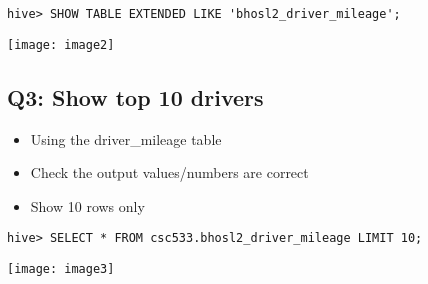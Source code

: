\documentclass[]{article}
\begin{document}
\begin{verbatim}
hive> SHOW TABLE EXTENDED LIKE 'bhosl2_driver_mileage';
\end{verbatim}
\texttt{[image: image2]}
 
\subsection*{Q3: Show top 10 drivers}
\begin{itemize}[before=\itshape,font=\normalfont]
	\item Using the driver\_mileage table
	\item Check the output values/numbers are correct
	\item Show 10 rows only
\end{itemize} 

\begin{verbatim}
hive> SELECT * FROM csc533.bhosl2_driver_mileage LIMIT 10;
\end{verbatim}
\texttt{[image: image3]}
\end{document}
